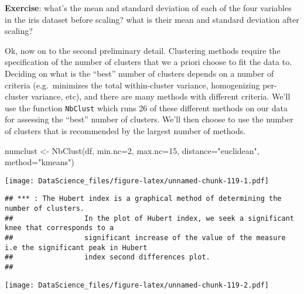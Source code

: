 \documentclass[
]{book}
\newenvironment{Shaded}{\begin{snugshade}}{\end{snugshade}}
\newcommand{\AttributeTok}[1]{\textcolor[rgb]{0.77,0.63,0.00}{#1}}
\newcommand{\DecValTok}[1]{\textcolor[rgb]{0.00,0.00,0.81}{#1}}
\newcommand{\FunctionTok}[1]{\textcolor[rgb]{0.00,0.00,0.00}{#1}}
\newcommand{\NormalTok}[1]{#1}
\newcommand{\OtherTok}[1]{\textcolor[rgb]{0.56,0.35,0.01}{#1}}
\newcommand{\StringTok}[1]{\textcolor[rgb]{0.31,0.60,0.02}{#1}}
\begin{document}
\textbf{Exercise}: what's the mean and standard deviation of each of the four variables in the iris dataset before scaling? what is their mean and standard deviation after scaling?

Ok, now on to the second preliminary detail. Clustering methods require the specification of the number of clusters that we a priori choose to fit the data to. Deciding on what is the ``best'' number of clusters depends on a number of criteria (e.g.~minimizes the total within-cluster variance, homogenizing per-cluster variance, etc), and there are many methods with different criteria. We'll use the function \texttt{NbClust} which runs 26 of these different methods on our data for assessing the ``best'' number of clusters. We'll then choose to use the number of clusters that is recommended by the largest number of methods.

\begin{Shaded}
\begin{Highlighting}[]
\NormalTok{numclust }\OtherTok{\textless{}{-}} \FunctionTok{NbClust}\NormalTok{(df, }\AttributeTok{min.nc=}\DecValTok{2}\NormalTok{, }\AttributeTok{max.nc=}\DecValTok{15}\NormalTok{, }\AttributeTok{distance=}\StringTok{"euclidean"}\NormalTok{, }\AttributeTok{method=}\StringTok{"kmeans"}\NormalTok{)}
\end{Highlighting}
\end{Shaded}

\texttt{[image: DataScience\_files/figure-latex/unnamed-chunk-119-1.pdf]}

\begin{verbatim}
## *** : The Hubert index is a graphical method of determining the number of clusters.
##                 In the plot of Hubert index, we seek a significant knee that corresponds to a 
##                 significant increase of the value of the measure i.e the significant peak in Hubert
##                 index second differences plot. 
## 
\end{verbatim}

\texttt{[image: DataScience\_files/figure-latex/unnamed-chunk-119-2.pdf]}
\end{document}
